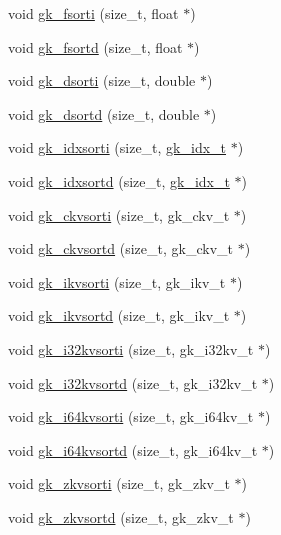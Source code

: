 \begin{DoxyCompactItemize}
\item 
void \hyperlink{a00077_a317c6a7c27cdf7ba3ebe40c948d7abcd}{gk\+\_\+fsorti} (size\+\_\+t, float $\ast$)
\item 
void \hyperlink{a00077_a48c8529cf48d82eedbf29d00cc257b8b}{gk\+\_\+fsortd} (size\+\_\+t, float $\ast$)
\item 
void \hyperlink{a00077_ae20383e7b5471e1ad0ceb9d037035b91}{gk\+\_\+dsorti} (size\+\_\+t, double $\ast$)
\item 
void \hyperlink{a00077_a6e1f615368dfbfb4b0f391ef65160454}{gk\+\_\+dsortd} (size\+\_\+t, double $\ast$)
\item 
void \hyperlink{a00077_ad863e6e90eb4028e89bfb66e8d8a3c08}{gk\+\_\+idxsorti} (size\+\_\+t, \hyperlink{a00083_a899f9d8c47b1ca0c2fead41097f4bde2}{gk\+\_\+idx\+\_\+t} $\ast$)
\item 
void \hyperlink{a00077_a77534ffafbfc5bebe4b527548d60a1ee}{gk\+\_\+idxsortd} (size\+\_\+t, \hyperlink{a00083_a899f9d8c47b1ca0c2fead41097f4bde2}{gk\+\_\+idx\+\_\+t} $\ast$)
\item 
void \hyperlink{a00077_a2e1587a8793ed508ae89b05bb6dcef8d}{gk\+\_\+ckvsorti} (size\+\_\+t, gk\+\_\+ckv\+\_\+t $\ast$)
\item 
void \hyperlink{a00077_af5f258b4ced6920c3b37486133a38e31}{gk\+\_\+ckvsortd} (size\+\_\+t, gk\+\_\+ckv\+\_\+t $\ast$)
\item 
void \hyperlink{a00077_a87b4cd1adb002c1987c1537130e8ee31}{gk\+\_\+ikvsorti} (size\+\_\+t, gk\+\_\+ikv\+\_\+t $\ast$)
\item 
void \hyperlink{a00077_a6630af89129be5c65ca81e3f3cfc3f9f}{gk\+\_\+ikvsortd} (size\+\_\+t, gk\+\_\+ikv\+\_\+t $\ast$)
\item 
void \hyperlink{a00077_a688a9ee048d1e7190a680582ed43e771}{gk\+\_\+i32kvsorti} (size\+\_\+t, gk\+\_\+i32kv\+\_\+t $\ast$)
\item 
void \hyperlink{a00077_a77fbfda4552002a94111aa6321c6493e}{gk\+\_\+i32kvsortd} (size\+\_\+t, gk\+\_\+i32kv\+\_\+t $\ast$)
\item 
void \hyperlink{a00077_ac0b219fef58f0a3ba7019578ed04217e}{gk\+\_\+i64kvsorti} (size\+\_\+t, gk\+\_\+i64kv\+\_\+t $\ast$)
\item 
void \hyperlink{a00077_aee24bdc162430cb1629fb52b14fa543d}{gk\+\_\+i64kvsortd} (size\+\_\+t, gk\+\_\+i64kv\+\_\+t $\ast$)
\item 
void \hyperlink{a00077_a1af9242bde9d9741c040177a7ab0be71}{gk\+\_\+zkvsorti} (size\+\_\+t, gk\+\_\+zkv\+\_\+t $\ast$)
\item 
void \hyperlink{a00077_abc86dfec06dd608e4b6428b09afc9eb7}{gk\+\_\+zkvsortd} (size\+\_\+t, gk\+\_\+zkv\+\_\+t $\ast$)

\end{DoxyCompactItemize}
